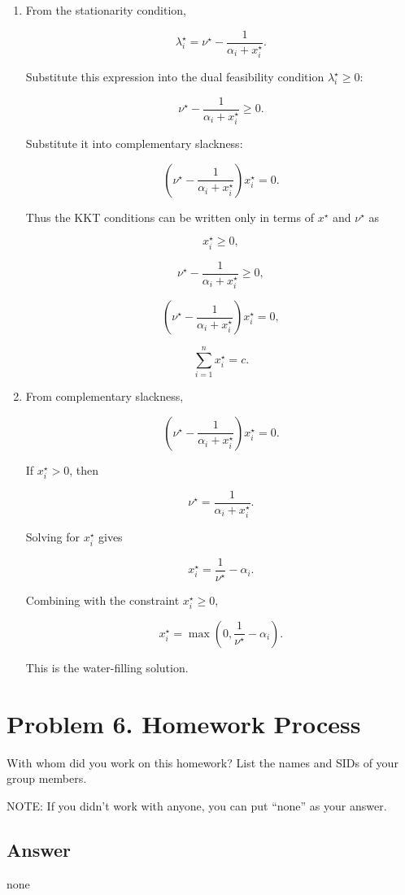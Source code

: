 \documentclass[
	12pt,
]{fphw}
\begin{document}
\begin{enumerate}
\[
\frac{\partial L}{\partial x_i}
=
-\frac{1}{\alpha_i+x_i}
-\lambda_i
+\nu.
\]

Thus stationarity gives

\[
-\frac{1}{\alpha_i+x_i^\star}-\lambda_i^\star+\nu^\star=0,
\qquad i=1,\ldots,n.
\]

\item[(d)]

From the stationarity condition,

\[
\lambda_i^\star
=
\nu^\star-\frac{1}{\alpha_i+x_i^\star}.
\]

Substitute this expression into the dual feasibility condition
$\lambda_i^\star\ge0$:

\[
\nu^\star-\frac{1}{\alpha_i+x_i^\star}\ge0.
\]

Substitute it into complementary slackness:

\[
\left(\nu^\star-\frac{1}{\alpha_i+x_i^\star}\right)x_i^\star=0.
\]

Thus the KKT conditions can be written only in terms of
$x^\star$ and $\nu^\star$ as

\[
x_i^\star\ge0,
\]

\[
\nu^\star-\frac{1}{\alpha_i+x_i^\star}\ge0,
\]

\[
\left(\nu^\star-\frac{1}{\alpha_i+x_i^\star}\right)x_i^\star=0,
\]

\[
\sum_{i=1}^n x_i^\star=c.
\]

\item[(e)]

From complementary slackness,

\[
\left(\nu^\star-\frac{1}{\alpha_i+x_i^\star}\right)x_i^\star=0.
\]

If $x_i^\star>0$, then

\[
\nu^\star=\frac{1}{\alpha_i+x_i^\star}.
\]

Solving for $x_i^\star$ gives

\[
x_i^\star=\frac{1}{\nu^\star}-\alpha_i.
\]

Combining with the constraint $x_i^\star\ge0$,

\[
x_i^\star=\max\left(0,\frac{1}{\nu^\star}-\alpha_i\right).
\]

This is the water-filling solution.
\end{enumerate}



\section*{Problem 6. Homework Process}

With whom did you work on this homework?
List the names and SIDs of your group members.

NOTE: If you didn’t work with anyone, you can put “none” as your answer.

\subsection*{Answer}

none
\end{document}

